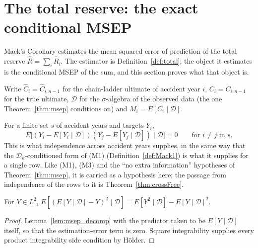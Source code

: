 
\section{The total reserve: the exact conditional MSEP}

Mack's Corollary estimates the mean squared error of prediction of the total reserve
$\hat R = \sum_i \hat R_i$. The estimator is Definition~\ref{def:total}; the object it
estimates is the conditional MSEP of the sum, and this section proves what that object is.

Write $\hat C_i = \hat C_{i,n-1}$ for the chain-ladder ultimate of accident year $i$,
$C_i = C_{i,n-1}$ for the true ultimate, $\mathcal{D}$ for the $\sigma$-algebra of the observed
data (the one Theorem~\ref{thm:msep} conditions on) and $M_i = E[C_i \mid \mathcal{D}]$.

\begin{definition}\label{def:crossFree}\leanok
For a finite set $s$ of accident years and targets $Y_i$,
\[
  E\big[(Y_i - E[Y_i \mid \mathcal{D}])(Y_j - E[Y_j \mid \mathcal{D}]) \;\big|\; \mathcal{D}\big] = 0
  \qquad \text{for } i \ne j \text{ in } s .
\]
This is what independence across accident years supplies, in the same way that the
$\mathcal{D}_k$-conditioned form of (M1) (Definition~\ref{def:Mack1}) is what it supplies for a
single row. Like (M1), (M3) and the ``no extra information'' hypotheses of
Theorem~\ref{thm:msep}, it is carried as a hypothesis here; the passage from independence of the
rows to it is Theorem~\ref{thm:crossFree}.
\end{definition}

\begin{lemma}\label{lem:centred}\leanok
{}
For $Y \in L^2$, $E[(E[Y \mid \mathcal{D}] - Y)^2 \mid \mathcal{D}] = E[Y^2 \mid \mathcal{D}] - E[Y \mid \mathcal{D}]^2$.
\end{lemma}
\begin{proof}\leanok
Lemma~\ref{lem:msep_decomp} with the predictor taken to be $E[Y \mid \mathcal{D}]$ itself, so that
the estimation-error term is zero. Square integrability supplies every product integrability side
condition by H\"older.
\end{proof}

